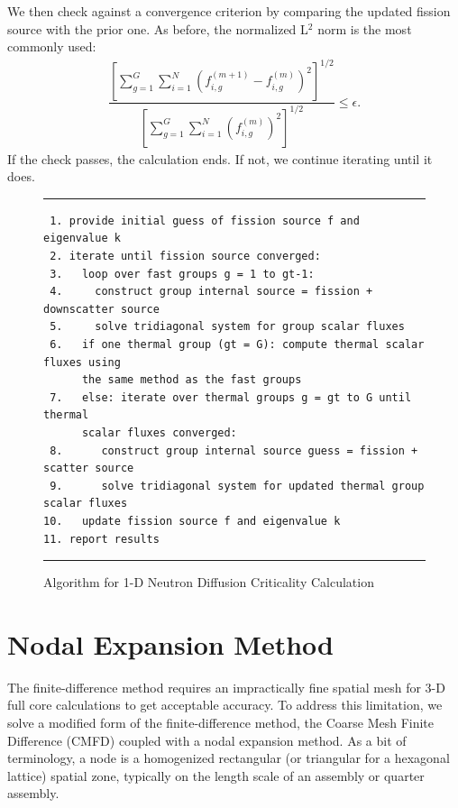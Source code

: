 We then check against a convergence criterion by comparing the updated fission source with the prior one. As before, the normalized L$^2$ norm is the most commonly used:
\begin{align}
  \dfrac{ \left[ \displaystyle\sum_{g=1}^G \sum_{i=1}^N \left( f_{i,g}^{(m+1)} - f_{i,g}^{(m)} \right)^2 \right]^{1/2} }
  		{ \left[ \displaystyle\sum_{g=1}^G \sum_{i=1}^N \left( f_{i,g}^{(m)} \right)^2 \right]^{1/2} }  \le \epsilon .
\end{align}
If the check passes, the calculation ends. If not, we continue iterating until it does.

\begin{figure}[tb!]
\begin{center}
\noindent \rule{\textwidth}{1pt}
\begin{verbatim}
 1. provide initial guess of fission source f and eigenvalue k
 2. iterate until fission source converged:
 3.   loop over fast groups g = 1 to gt-1:
 4.     construct group internal source = fission + downscatter source
 5.     solve tridiagonal system for group scalar fluxes
 6.   if one thermal group (gt = G): compute thermal scalar fluxes using
      the same method as the fast groups 
 7.   else: iterate over thermal groups g = gt to G until thermal 
      scalar fluxes converged:
 8.      construct group internal source guess = fission + scatter source
 9.      solve tridiagonal system for updated thermal group scalar fluxes
10.   update fission source f and eigenvalue k
11. report results 
\end{verbatim}
\rule{\textwidth}{1pt}
\caption{Algorithm for 1-D Neutron Diffusion Criticality Calculation}
\label{Fig:neutronics_criticalityDiffusionCalculation}
\end{center}
\end{figure}








\section{Nodal Expansion Method}

The finite-difference method requires an impractically fine spatial mesh for 3-D full core calculations to get acceptable accuracy. To address this limitation, we solve a modified form of the finite-difference method, the Coarse Mesh Finite Difference (CMFD) coupled with a nodal expansion method. As a bit of terminology, a node is a homogenized rectangular (or triangular for a hexagonal lattice) spatial zone, typically on the length scale of an assembly or quarter assembly.

